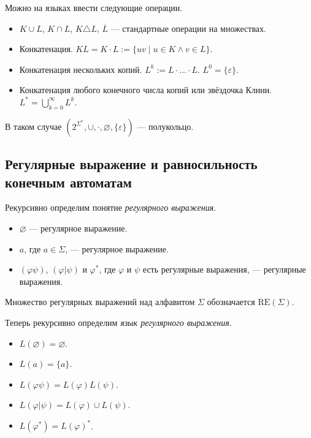 \documentclass[12pt,a4paper]{article}
\newcommand{\RE}{\mathrm{RE}}
\begin{document}
    \begin{remark}
        Можно на языках ввести следующие операции.
        \begin{itemize}
            \item $K \cup L$, $K \cap L$, $K \triangle L$, $\overline{L}$ --- стандартные операции на множествах.
            \item Конкатенация. $KL = K \cdot L := \{uv \mid u \in K \wedge v \in L\}$.
            \item Конкатенация нескольких копий. $L^k := L \cdot \dots \cdot L$. $L^0 = \{\varepsilon\}$.
            \item Конкатенация любого конечного числа копий или звёздочка Клини. $L^* = \bigcup_{k=0}^\infty L^k$.
        \end{itemize}

        В таком случае $(2^{\Sigma^*}, {\cup}, {\cdot}, \varnothing, \{\varepsilon\})$ --- полукольцо.
    \end{remark}

    \subsection{Регулярные выражение и равносильность конечным автоматам}

    \begin{definition}
        Рекурсивно определим понятие \emph{регулярного выражения}.
        \begin{itemize}
            \item $\varnothing$ --- регулярное выражение.
            \item $a$, где $a \in \Sigma$, --- регулярное выражение.
            \item $(\varphi \psi)$, $(\varphi | \psi)$ и $\varphi^*$, где $\varphi$ и $\psi$ есть регулярные выражения, --- регулярные выражения.
        \end{itemize}
        Множество регулярных выражений над алфавитом $\Sigma$ обозначается $\RE(\Sigma)$.
        
        Теперь рекурсивно определим \emph{язык регулярного выражения}.
        \begin{itemize}
            \item $L(\varnothing) = \varnothing$.
            \item $L(a) = \{a\}$.
            \item $L(\varphi \psi) = L(\varphi) L(\psi)$.
            \item $L(\varphi | \psi) = L(\varphi) \cup L(\psi)$.
            \item $L(\varphi^*) = L(\varphi)^*$.
        \end{itemize}
    \end{definition}
\end{document}
